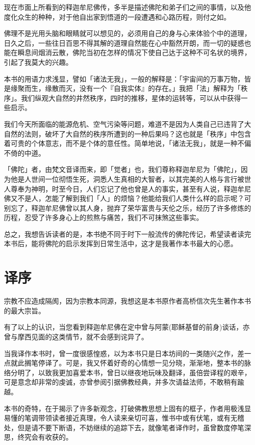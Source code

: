 \documentclass[twoside,openany]{book}
\begin{document}
现在市面上所看到的释迦牟尼佛传，多半是描述佛陀和弟子们之间的事情，以及他度化众生的种种，对于他自出家到悟道的一段遭遇和心路历程，则付之如。

佛理不是光用头脑和眼睛就可以想见的，必须用自己的身与心来体验个中的道理，日久之后，一些往日百思不得其解的道理自然能在心中豁然开朗，而一切的疑惑也能在瞬息间烟消云散，佛陀当初在怎样的情况下使自己达于这种不可名状的境界，引起了我莫大的兴趣。

本书的用语力求浅显，譬如「诸法无我」，一般的解释是：「宇宙间的万事万物，皆是缘聚而生，缘散而灭，没有一个『自我实体』的存在。」我把「法」解释为「秩序」。我们纵观大自然的井然秩序，四时的推移，星体的运转等，可以从中获得一些启示。

我们今天所面临的能源危机、空气污染等问题，难道不是因为人类自己已违背了大自然的法则，破坏了大自然的秩序所遭到的一种后果吗？这也就是「秩序」中包含着可贵的个体意志，而不是个体的意任性。简单地说，「诸法无我」，就是一种不偏不倚的中道。

「佛陀」者，由梵文音译而来，即「觉者」也，我们尊称释迦牟尼为「佛陀」，因为他是人世间一位彻悟生死，洞悉人生真相的大智者，以其完美的人格与言行被世人尊奉为神明，时至今日，人们忘记了他也曾是人的事实，甚至有人说，释迦牟尼佛又不是人，怎能了解到我们「人」的烦恼？他能给我们人类什么样的启示呢？可别忘了，释迦牟尼佛曾以其人身，抛弃了荣华富贵与天伦之乐，经历了许多修炼的历程，忍受了许多身心上的煎熬与痛苦，我们不可抹煞这些事实。

总之，我想告诉读者的是，本书绝不同于时下一般流传的佛陀传记，希望读者读完本书后，能将佛陀的启示发挥到日常生活中，这才是我著作本书最大的心愿。


\chapter*{译序}
宗教不应造成隔阂，因为宗教本同源，我想这是本书原作者高桥信次先生著作本书的最大宗旨。

有了以上的认识，当您看到释迦牟尼佛在定中曾与阿蒙(耶稣基督的前身)谈话，亦曾与摩西见面的这类情节，就不会感到诧异了。

当我译作本书时，曾一度很感惶惑，以为本书只是日本坊间的一类随兴之作，差一点就此搁笔停译了。可是，我又怀着好奇的心情想一见分晓，渐渐地，整本书的脉络分明了，以致我更加喜爱本书，曾日以继夜地玩味及翻译，虽倍尝译程的艰辛，可是意念却非常的虔诚，亦曾参阅引据佛教经典，并多次请益法师，不敢稍有踰越。

本书的奇特，在于揭示了许多新观念，打破佛教思想上固有的框子，作者用极浅显易懂的笔调带领读者接近真理，令人读来亲切可喜，惟书中或有伏笔，或有无稽处，但是请不要下断语，不妨继续的追踪下去，就像笔者译作时，虽曾数度停笔深思，终究会有收获的。
\end{document}

